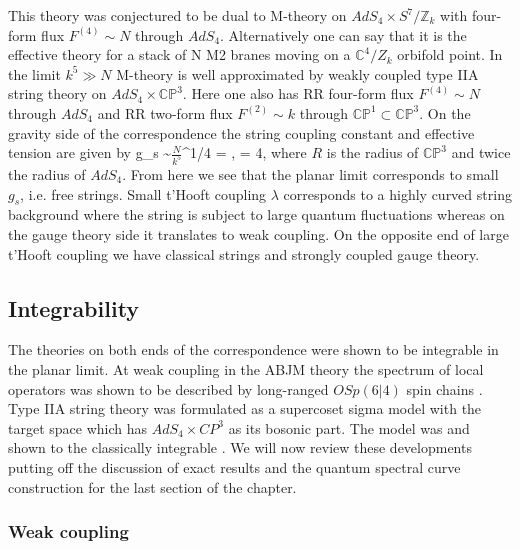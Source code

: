 This theory was conjectured \cite{Aharony:2008ug} to be dual to M-theory on $AdS_4 \times S^7 / \mathbb{Z}_k$ with four-form flux $F^{(4)} \sim N$ through $AdS_4$. 
Alternatively one can say that it is the effective theory for a stack of N M2 branes moving on a $\mathbb{C}^4 / Z_k$ orbifold point. 
In the limit $k^5 \gg N$ M-theory is well approximated by weakly coupled type IIA string theory on $AdS_4 \times \mathbb{CP}^3$.
Here one also has RR four-form flux $F^{(4)} \sim N $ through $AdS_4$ and RR two-form flux $F^{(2)} \sim k $ through $\mathbb{CP}^1 \subset \mathbb{CP}^3$. 
On the gravity side of the correspondence the string coupling constant and effective tension are given by
\beq
	g_s \sim \( \frac{N}{k^5} \)^{1/4} = , \;\;\;\;\;  = 4\pi \sqrt{2\lambda},
\eeq
where $R$ is the radius of $\mathbb{CP}^3$ and twice the radius of $AdS_4$.
From here we see that the planar limit corresponds to small $g_s$, i.e. free strings.
Small t'Hooft coupling $\lambda$ corresponds to a highly curved string background where the string is subject to large quantum fluctuations whereas on the gauge theory side it translates to weak coupling. 
On the opposite end of large t'Hooft coupling we have classical strings and strongly coupled gauge theory.


\subsection{Integrability}
\label{sec:abjm_integrability}

The theories on both ends of the correspondence were shown to be integrable in the planar limit.
At weak coupling in the ABJM theory the spectrum of local operators was shown to be described by long-ranged $OSp(6|4)$ spin chains \cite{Minahan:2008hf}.
Type IIA string theory was formulated as a supercoset sigma model with the target space
\beq
{}
\eeq
which has $AdS_4\times CP^3$ as its bosonic part.
The model was and shown to the classically integrable \cite{Stefanski:2008ik,Arutyunov:2008if}. 
We will now review these developments putting off the discussion of exact results and the quantum spectral curve construction for the last section of the chapter. 

\subsubsection{Weak coupling}


